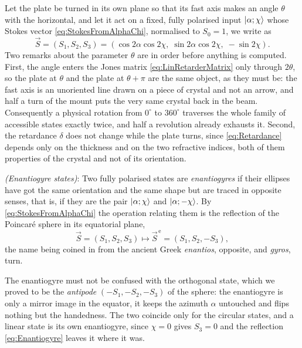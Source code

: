             Let the plate be turned in its own plane so that its fast axis makes an angle $\theta$ with the horizontal, and let it act on a fixed, fully polarised input $\ket{\alpha;\chi}$ whose Stokes vector \ref{eq:StokesFromAlphaChi}, normalised to $S_0=1$, we write as
            \begin{equation}\label{eq:InputStokesRotating}
                \vec{S} = \left(S_1,S_2,S_3\right) = \left(\cos2\alpha\cos2\chi,\;\sin2\alpha\cos2\chi,\;-\sin2\chi\right).
            \end{equation}
            Two remarks about the parameter $\theta$ are in order before anything is computed. First, the angle enters the Jones matrix \ref{eq:LinRetarderMatrix} only through $2\theta$, so the plate at $\theta$ and the plate at $\theta+\pi$ are the same object, as they must be: the fast axis is an unoriented line drawn on a piece of crystal and not an arrow, and half a turn of the mount puts the very same crystal back in the beam. Consequently a physical rotation from $0^{\circ}$ to $360^{\circ}$ traverses the whole family of accessible states exactly twice, and half a revolution already exhausts it. Second, the retardance $\delta$ does not change while the plate turns, since \ref{eq:Retardance} depends only on the thickness and on the two refractive indices, both of them properties of the crystal and not of its orientation.

            \begin{myDef}
                \textit{(Enantiogyre states)}: Two fully polarised states are \emph{enantiogyres} if their ellipses have got the same orientation and the same shape but are traced in opposite senses, that is, if they are the pair $\ket{\alpha;\chi}$ and $\ket{\alpha;-\chi}$. By \ref{eq:StokesFromAlphaChi} the operation relating them is the reflection of the Poincaré sphere in its equatorial plane,
                \begin{equation}\label{eq:Enantiogyre}
                    \vec{S}=\left(S_1,S_2,S_3\right) \longmapsto \vec{S}^{\,\text{e}}=\left(S_1,S_2,-S_3\right),
                \end{equation}
                the name being coined in \citep{salazar2021dinamica} from the ancient Greek \textit{enantios}, opposite, and \textit{gyros}, turn.
            \end{myDef}

            The enantiogyre must not be confused with the orthogonal state, which we proved to be the \textit{antipode} $\left(-S_1,-S_2,-S_3\right)$ of the sphere: the enantiogyre is only a mirror image in the equator, it keeps the azimuth $\alpha$ untouched and flips nothing but the handedness. The two coincide only for the circular states, and a linear state is its own enantiogyre, since $\chi=0$ gives $S_3=0$ and the reflection \ref{eq:Enantiogyre} leaves it where it was.

